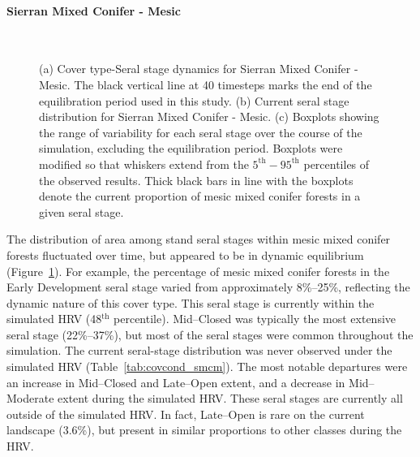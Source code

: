 \clearpage

\paragraph*{Sierran Mixed Conifer - Mesic}

\begin{figure}[!htbp]
  \centering
   \\
  \caption{(a) Cover type-Seral stage dynamics for Sierran Mixed Conifer - Mesic. The black vertical line at 40 timesteps marks the end of the equilibration period used in this study. (b) Current seral stage distribution for Sierran Mixed Conifer - Mesic. (c) Boxplots showing the range of variability for each seral stage over the course of the simulation, excluding the equilibration period. Boxplots were modified so that whiskers extend from the $5^{\text{th}} - 95^{\text{th}}$ percentiles of the observed results. Thick black bars in line with the boxplots denote the current proportion of mesic mixed conifer forests in a given seral stage.} 
  \label{fig:hrv-covcond_smcm}
\end{figure}

The distribution of area among stand seral stages within mesic mixed conifer forests fluctuated over time, but appeared to be in dynamic equilibrium (Figure~\ref{fig:hrv-covcond_smcm}). For example, the percentage of mesic mixed conifer forests in the Early Development seral stage varied from approximately 8\%--25\%, reflecting the dynamic nature of this cover type. This seral stage is currently within the simulated HRV (48$^{\text{th}}$ percentile). Mid--Closed was typically the most extensive seral stage (22\%--37\%), but most of the seral stages were common throughout the simulation. %
The current seral-stage distribution was never observed under the simulated HRV (Table~\ref{tab:covcond_smcm}). The most notable departures were an increase in Mid--Closed and Late--Open extent, and a decrease in Mid--Moderate extent during the simulated HRV. These seral stages are currently all outside of the simulated HRV. In fact, Late--Open is rare on the current landscape (3.6\%), but present in similar proportions to  other classes during the HRV. 



